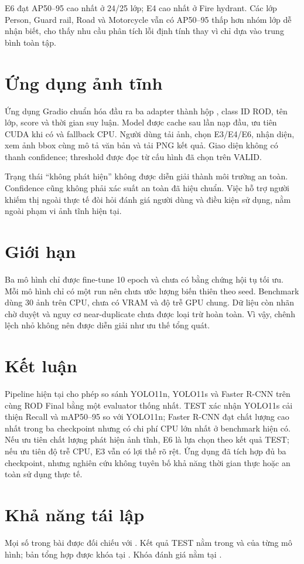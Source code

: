 \documentclass[10pt,a4paper,twocolumn]{article}
\begin{document}
E6 đạt AP50--95 cao nhất ở 24/25 lớp; E4 cao nhất ở Fire hydrant. Các lớp Person, Guard rail, Road và Motorcycle vẫn có AP50--95 thấp hơn nhóm lớp dễ nhận biết, cho thấy nhu cầu phân tích lỗi định tính thay vì chỉ dựa vào trung bình toàn tập.

\section{Ứng dụng ảnh tĩnh}
Ứng dụng Gradio chuẩn hóa đầu ra ba adapter thành hộp , class ID ROD, tên lớp, score và thời gian suy luận. Model được cache sau lần nạp đầu, ưu tiên CUDA khi có và fallback CPU. Người dùng tải ảnh, chọn E3/E4/E6, nhận diện, xem ảnh bbox cùng mô tả văn bản và tải PNG kết quả. Giao diện không có thanh confidence; threshold được đọc từ cấu hình đã chọn trên VALID.

Trạng thái ``không phát hiện'' không được diễn giải thành môi trường an toàn. Confidence cũng không phải xác suất an toàn đã hiệu chuẩn. Việc hỗ trợ người khiếm thị ngoài thực tế đòi hỏi đánh giá người dùng và điều kiện sử dụng, nằm ngoài phạm vi ảnh tĩnh hiện tại.

\section{Giới hạn}
Ba mô hình chỉ được fine-tune 10 epoch và chưa có bằng chứng hội tụ tối ưu. Mỗi mô hình chỉ có một run nên chưa ước lượng biến thiên theo seed. Benchmark dùng 30 ảnh trên CPU, chưa có VRAM và độ trễ GPU chung. Dữ liệu còn nhãn chờ duyệt và nguy cơ near-duplicate chưa được loại trừ hoàn toàn. Vì vậy, chênh lệch nhỏ không nên được diễn giải như ưu thế tổng quát.

\section{Kết luận}
Pipeline hiện tại cho phép so sánh YOLO11n, YOLO11s và Faster R-CNN trên cùng ROD Final bằng một evaluator thống nhất. TEST xác nhận YOLO11s cải thiện Recall và mAP50--95 so với YOLO11n; Faster R-CNN đạt chất lượng cao nhất trong ba checkpoint nhưng có chi phí CPU lớn nhất ở benchmark hiện có. Nếu ưu tiên chất lượng phát hiện ảnh tĩnh, E6 là lựa chọn theo kết quả TEST; nếu ưu tiên độ trễ CPU, E3 vẫn có lợi thế rõ rệt. Ứng dụng đã tích hợp đủ ba checkpoint, nhưng nghiên cứu không tuyên bố khả năng thời gian thực hoặc an toàn sử dụng thực tế.

\section*{Khả năng tái lập}
Mọi số trong bài được đối chiếu với . Kết quả TEST nằm trong  và  của từng mô hình; bản tổng hợp được khóa tại . Khóa đánh giá nằm tại .



\end{document}
